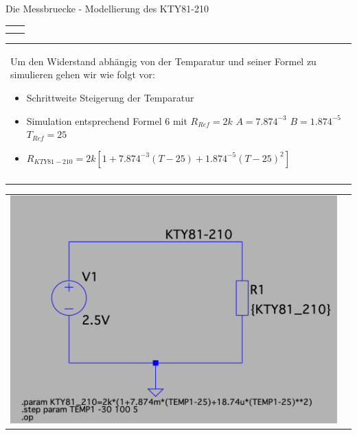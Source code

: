 \begin{frame}[t]{Die Messbruecke - Modellierung des KTY81-210}
\begin{spacing}{0.9}
\begin{tiny}
\begin{table}[h!]
\begin{tabular}{p{3cm} p{7cm}}
\begin{minipage}{.7\textwidth}
                    \end{minipage}
                    \\\\
                \end{tabular}
                \begin{tabular}{p{10cm}}
                    \begin{minipage}{\textwidth}
                        Um den Widerstand abhängig von der Temparatur und seiner Formel zu simulieren gehen wir wie folgt vor:
                        \begin{itemize}
                            \item Schrittweite Steigerung der Temparatur
                            \item Simulation entsprechend Formel 6 mit $R_{Ref}=2k$ $A=7.874^{-3}$ $B=1.874^{-5}$ $T_{Ref}=25$
                            \item $R_{KTY81-210}=2k[1+7.874^{-3}(T-25)+1.874^{-5}(T-25)^2]$
                        \end{itemize}
                    \end{minipage}
                    \\ \\
                \end{tabular}
                \begin{tabular}{p{3cm} p{7cm}}
                    \begin{minipage}{.3\textwidth}
                        \includegraphics[width=0.8\linewidth]{pictures/kty81_simulation.png}
                    \end{minipage}
                     &
                    \begin{minipage}{.7\textwidth}
                        \begin{itemize}

\end{itemize}
\end{minipage}
\end{tabular}
\end{table}
\end{tiny}
\end{spacing}
\end{frame}
